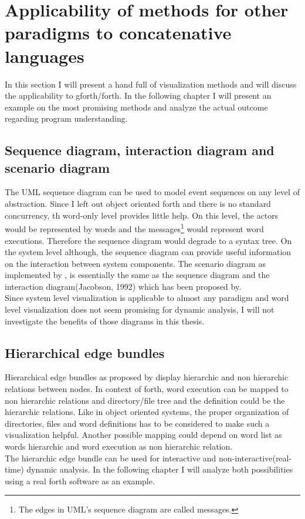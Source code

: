\section{Applicability of methods for other paradigms to concatenative languages}

In this section I will present a hand full of visualization methods and will discuss the applicability to gforth/forth. In the following chapter I will present an example on the most promising methods and analyze the actual outcome regarding program understanding. 

\subsection*{Sequence diagram, interaction diagram and scenario diagram}

The \gls{UML} sequence diagram can be used to model event sequences on any level of abstraction. Since I left out object oriented forth and there is no standard concurrency, th word-only level provides little help. On this level, the actors would be represented by words and the messages\footnote{The edges in UML's sequence diagram are called messages.} would represent word executions. Therefore the sequence diagram would degrade to a syntax tree. On the system level although, the sequence diagram can provide useful information on the interaction between system components. The scenario diagram as implemented by \cite{Koskimies:1996:SUS:871313}, is essentially the same as the sequence diagram and the interaction diagram(Jacobson, 1992) which has been proposed by.
\\
Since system level visualization is applicable to almost any paradigm and word level visualization does not seem promising for dynamic analysis, I will not investigate the benefits of those diagrams in this thesis.

\subsection*{Hierarchical edge bundles}
Hierarchical edge bundles as proposed by \cite{Holten:2006:HEB:1187627.1187772} display hierarchic and non hierarchic relations between nodes. In context of forth, word execution can be mapped to non hierarchic relations and directory/file tree and the definition could be the hierarchic relations. Like in object oriented systems, the proper organization of directories, files and word definitions has to be considered to make such a visualization helpful.
Another possible mapping could depend on word list as words hierarchic and word execution as non hierarchic relation.
\\
The hierarchic edge bundle can be used for interactive and non-interactive(real-time) dynamic analysis. In the following chapter I will analyze both possibilities using a real forth software as an example.

